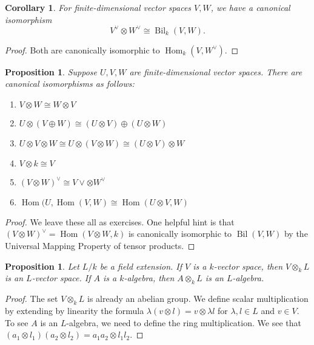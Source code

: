 \documentclass[12pt]{article}
\theoremstyle{plain}
\newtheorem{proposition}[theorem]{Proposition}
\newtheorem{corollary}[theorem]{Corollary}
\theoremstyle{definition}
\theoremstyle{remark}
\numberwithin{equation}{section}
\begin{document}
\begin{corollary}
For finite-dimensional vector spaces $V, W$,
we have a canonical isomorphism
\[
V^\vee \otimes W^\vee \cong \operatorname{Bil}_k(V,W) .
\]
\end{corollary}

\begin{proof}
Both are canonically isomorphic to $\operatorname{Hom}_k(V,W^\vee)$.
\end{proof}

\begin{proposition}
Suppose $U,V,W$ are finite-dimensional vector spaces.
There are canonical isomorphisms as follows:
\begin{enumerate}
\item $V \otimes W \cong W \otimes V$
\item $U \otimes (V \oplus W) \cong (U \otimes V) \oplus (U \otimes W)$
\item $U \otimes V \otimes W \cong U \otimes (V \otimes W)
\cong (U \otimes V) \otimes W$
\item $V \otimes k \cong V$
\item $(V \otimes W)^\vee \cong V\vee \otimes W^\vee$
\item $\operatorname{Hom}(U,\operatorname{Hom}(V,W)
\cong \operatorname{Hom}(U \otimes V, W)$
\end{enumerate}
\end{proposition}

\begin{proof}
We leave these all as exercises.
One helpful hint is that
$(V \otimes W)^\vee = \operatorname{Hom}(V \otimes W,k)$
is canonically isomorphic to $\operatorname{Bil}(V,W)$
by the Universal Mapping Property of tensor products.
\end{proof}

\begin{proposition}
Let $L/k$ be a field extension.
If $V$ is a $k$-vector space, then $V \otimes_k L$ is an $L$-vector space.
If $A$ is a $k$-algebra, then $A \otimes_k L$ is an $L$-algebra.
\end{proposition}

\begin{proof}
The set $V \otimes_k L$ is already an abelian group.
We define scalar multiplication by extending by linearity
the formula $\lambda(v\otimes l)=v \otimes \lambda l$
for $\lambda, l \in L$ and $v \in V$.
To see $A$ is an $L$-algebra, we need to define the ring multiplication.
We see that $(a_1 \otimes l_1)(a_2 \otimes l_2)=a_1a_2 \otimes l_1l_2$.
\end{proof}
\end{document}
